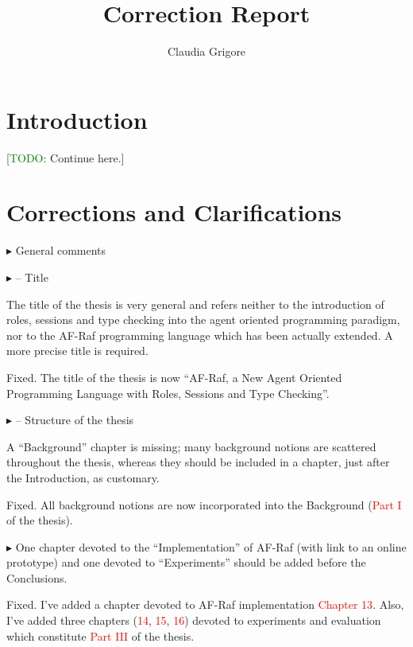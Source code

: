 \documentclass{article}
\title{Correction Report}
\author{Claudia Grigore}
\newcommand*\R[1]{\textcolor{red}{#1}} %
\newcommand{\todo}[1]{[\textcolor{green}{TODO}: #1]}
\newenvironment{them}%
  {\bigskip\noindent\begingroup\color{blue}$\blacktriangleright$\enspace}%
  {\endgroup\par}
\begin{document}
\maketitle

\section{Introduction}

\todo{Continue here.}
\section{Corrections and Clarifications}

\begin{them}
General comments
\end{them}


\begin{them}
-- Title

The title of the thesis is very general and refers neither to the introduction
of roles, sessions and type checking into the agent oriented programming
paradigm, nor to the AF-Raf programming language which has been actually
extended. A more precise title is required.
\end{them}
Fixed. The title of the thesis is now ``AF-Raf, a New Agent Oriented Programming
Language with Roles, Sessions and Type Checking''.

\begin{them}
-- Structure of the thesis

A ``Background'' chapter is missing; many background notions are scattered
throughout the thesis, whereas they should be included in a chapter, just after
the Introduction, as customary.
\end{them}
Fixed. All background notions are now incorporated into the Background (\R{Part
I} of the thesis).

\begin{them}
One chapter devoted to the ``Implementation'' of AF-Raf (with link to an online
prototype) and one devoted to ``Experiments'' should be added before the
Conclusions.
\end{them}
Fixed. I've added a chapter devoted to AF-Raf implementation \R{Chapter 13}.
Also, I've added three chapters (\R{14}, \R{15}, \R{16}) devoted to experiments
and evaluation which constitute \R{Part III} of the thesis.
\end{document}
